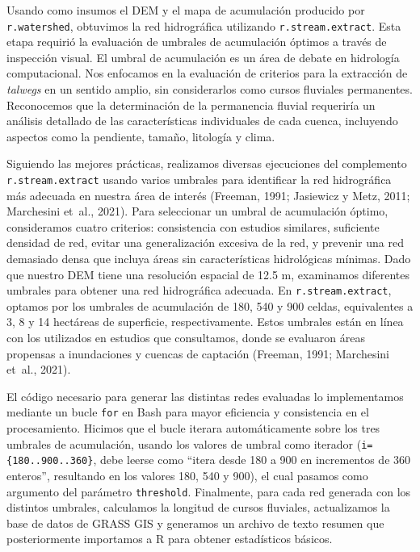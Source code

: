 \documentclass[spanish]{article}
\begin{document}
Usando como insumos el DEM y el mapa de acumulación producido por
\texttt{r.watershed}, obtuvimos la red hidrográfica utilizando
\texttt{r.stream.extract}. Esta etapa requirió la evaluación de umbrales
de acumulación óptimos a través de inspección visual. El umbral de
acumulación es un área de debate en hidrología computacional. Nos
enfocamos en la evaluación de criterios para la extracción de
\emph{talwegs} en un sentido amplio, sin considerarlos como cursos
fluviales permanentes. Reconocemos que la determinación de la
permanencia fluvial requeriría un análisis detallado de las
características individuales de cada cuenca, incluyendo aspectos como la
pendiente, tamaño, litología y clima.

Siguiendo las mejores prácticas, realizamos diversas ejecuciones del
complemento \texttt{r.stream.extract} usando varios umbrales para
identificar la red hidrográfica más adecuada en nuestra área de interés
(Freeman, 1991; Jasiewicz y Metz, 2011; Marchesini et~al., 2021). Para
seleccionar un umbral de acumulación óptimo, consideramos cuatro
criterios: consistencia con estudios similares, suficiente densidad de
red, evitar una generalización excesiva de la red, y prevenir una red
demasiado densa que incluya áreas sin características hidrológicas
mínimas. Dado que nuestro DEM tiene una resolución espacial de 12.5 m,
examinamos diferentes umbrales para obtener una red hidrográfica
adecuada. En \texttt{r.stream.extract}, optamos por los umbrales de
acumulación de 180, 540 y 900 celdas, equivalentes a 3, 8 y 14 hectáreas
de superficie, respectivamente. Estos umbrales están en línea con los
utilizados en estudios que consultamos, donde se evaluaron áreas
propensas a inundaciones y cuencas de captación (Freeman, 1991;
Marchesini et~al., 2021).

El código necesario para generar las distintas redes evaluadas lo
implementamos mediante un bucle \texttt{for} en Bash para mayor
eficiencia y consistencia en el procesamiento. Hicimos que el bucle
iterara automáticamente sobre los tres umbrales de acumulación, usando
los valores de umbral como iterador (\texttt{i=\{180..900..360\}}, debe
leerse como ``itera desde 180 a 900 en incrementos de 360 enteros'',
resultando en los valores 180, 540 y 900), el cual pasamos como
argumento del parámetro \texttt{threshold}. Finalmente, para cada red
generada con los distintos umbrales, calculamos la longitud de cursos
fluviales, actualizamos la base de datos de GRASS GIS y generamos un
archivo de texto resumen que posteriormente importamos a R para obtener
estadísticos básicos.
\end{document}
